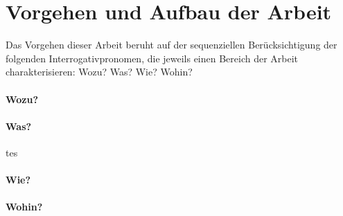 \section{Vorgehen und Aufbau der Arbeit}
Das Vorgehen dieser Arbeit beruht auf der sequenziellen Berücksichtigung der folgenden Interrogativpronomen, die jeweils einen Bereich der Arbeit charakterisieren: Wozu? Was? Wie? Wohin?

\paragraph{Wozu?}

\paragraph{Was?}
tes


\paragraph{Wie?}

\paragraph{Wohin?}
